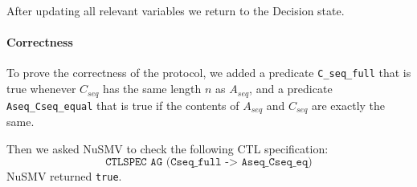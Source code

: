 \documentclass[12pt]{article}
\begin{document}
After updating all relevant variables we return to the Decision state.

\paragraph{Correctness} To prove the correctness of the protocol, 
we added a predicate \texttt{C\_seq\_full} that is true 
whenever $C_{seq}$ has the same length $n$ as $A_{seq}$, 
and a predicate \texttt{Aseq\_Cseq\_equal} that is true 
if the contents of $A_{seq}$ and $C_{seq}$ are exactly the same.

Then we asked NuSMV to check the following CTL specification:
\[ \texttt{CTLSPEC AG (Cseq\_full -> Aseq\_Cseq\_eq)} \]
NuSMV returned \texttt{true}.
\end{document}
